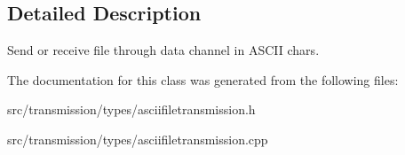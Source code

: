 \subsection{Detailed Description}
Send or receive file through data channel in A\+S\+C\+II chars. 

The documentation for this class was generated from the following files\+:\begin{DoxyCompactItemize}
\item 
src/transmission/types/asciifiletransmission.\+h\item 
src/transmission/types/asciifiletransmission.\+cpp\end{DoxyCompactItemize}
